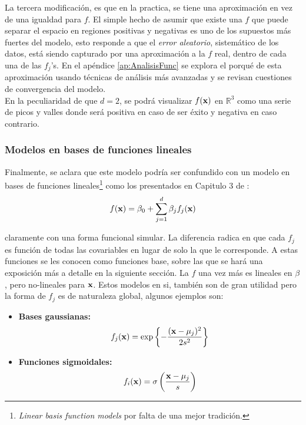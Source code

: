\documentclass[../Main/Main.tex]{subfiles}
\begin{document}
La tercera modificación, es que en la practica, se tiene una aproximación en vez de una igualdad para $f$. El simple hecho de asumir que existe una $f$ que puede separar el espacio en regiones positivas y negativas es uno de los supuestos más fuertes del modelo, esto responde a que el \textit{error aleatorio}, sistemático de los datos, está siendo capturado por una aproximación a la $f$ real, dentro de cada una de las $f_j$'s. En el apéndice \ref{ap:AnalisisFunc} se explora el porqué de esta aproximación usando técnicas de análisis más avanzadas y se revisan cuestiones de convergencia del modelo.\\

En la peculiaridad de que $d = 2$, se podrá visualizar $f(\mathbf{x})$ en $\mathbb{R}^3$ como una serie de picos y valles donde será positiva en caso de ser éxito y negativa en caso contrario.\\

\subsubsection*{Modelos en bases de funciones lineales}

Finalmente, se aclara que este modelo podría ser confundido con un modelo en bases de funciones lineales\footnote{\textit{Linear basis function models} por falta de una mejor tradición.} como los presentados en Capitulo 3 de \autocite{bishop2006pattern}:
\begin{align} 
	f(\mathbf{x}) = \beta_0 + \sum_{j = 1}^d\beta_j f_j(\mathbf{x}) \label{ec:ExpansionBases1}
\end{align}

claramente con una forma funcional simular. La diferencia radica en que cada $f_j$ es función de todas las covariables en lugar de solo la que le corresponde. A estas funciones se les conocen como funciones base, sobre las que se hará una exposición más a detalle en la siguiente sección. La $f$ una vez más es lineales en $\beta$, pero no-lineales para $\mathbf{x}$. Estos modelos en si, también son de gran utilidad pero la forma de $f_j$ es de naturaleza global, algunos ejemplos son:

\begin{itemize}
	\item \textbf{Bases gaussianas:}
	 $$f_j(\mathbf{x}) = 
	 \exp\left\{-\dfrac{(\mathbf{x} - \mu_j)^2}{2s^2}\right\}$$
	\item \textbf{Funciones sigmoidales:} 
	$$f_i(\mathbf{x}) = 
	\sigma\left( \dfrac{\mathbf{x} - \mu_j}{s} \right)$$
\end{itemize}
\end{document}
